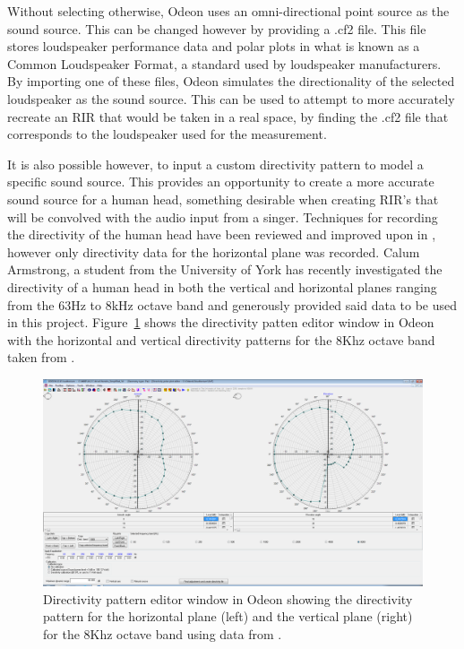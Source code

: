 \documentclass[../../main.tex]{subfiles}
\begin{document}
				Without selecting otherwise, Odeon uses an omni-directional point source as the sound source. This can be changed however by providing a .cf2 file. This file stores loudspeaker performance data and polar plots in what is known as a Common Loudspeaker Format, a standard used by loudspeaker manufacturers. By importing one of these files, Odeon simulates the directionality of the selected loudspeaker as the sound source. This can be used to attempt to more accurately recreate an \ac{RIR} that would be taken in a real space, by finding the .cf2 file that corresponds to the loudspeaker used for the measurement.

				It is also possible however, to input a custom directivity pattern to model a specific sound source. This provides an opportunity to create a more accurate sound source for a human head, something desirable when creating \ac{RIR}'s that will be convolved with the audio input from a singer. Techniques for recording the directivity of the human head have been reviewed and improved upon in \cite{Monson2012b}, however only directivity data for the horizontal plane was recorded. Calum Armstrong, a student from the University of York has recently investigated the directivity of a human head in both the vertical and horizontal planes ranging from the 63Hz to 8kHz octave band \cite{calum} and generously provided said data to be used in this project. Figure~\ref{directivity} shows the directivity patten editor window in Odeon with the horizontal and vertical directivity patterns for the 8Khz octave band taken from \cite{calum}. 


				\begin{figure}[H]
					\centerline{\includegraphics[scale = 0.3]{Sections/Implementation/Odeon/images/Directivity/DirectivityPattern.png}}
					\caption{Directivity pattern editor window in Odeon showing the directivity pattern for the horizontal plane (left) and the vertical plane (right) for the 8Khz octave band using data from \cite{calum}.}
					\label{directivity}
				\end{figure}
\end{document}
